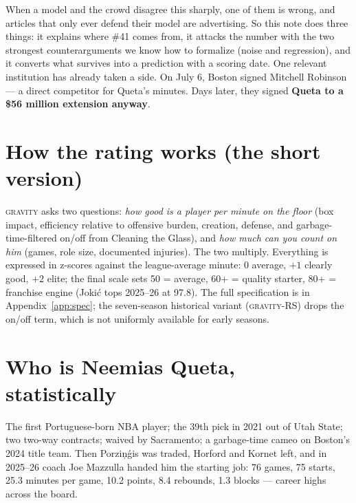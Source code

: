 \documentclass[11pt]{article}
\newcommand{\gravity}{\textsc{gravity}}
\begin{document}
When a model and the crowd disagree this sharply, one of them is wrong, and articles that
only ever defend their model are advertising. So this note does three things: it explains
where \#41 comes from, it attacks the number with the two strongest counterarguments we
know how to formalize (noise and regression), and it converts what survives into a
prediction with a scoring date. One relevant institution has already taken a side.
On July 6, Boston signed Mitchell Robinson --- a direct competitor for Queta's minutes.
Days later, they signed \textbf{Queta to a \$56 million extension anyway}.

\section{How the rating works (the short version)}
\label{sec:short}

\gravity{} asks two questions: \emph{how good is a player per minute on the floor}
(box impact, efficiency relative to offensive burden, creation, defense, and
garbage-time-filtered on/off from Cleaning the Glass), and \emph{how much can you count
on him} (games, role size, documented injuries). The two multiply. Everything is
expressed in z-scores against the league-average minute: $0$ average, $+1$ clearly good,
$+2$ elite; the final scale sets 50 = average, 60+ = quality starter, 80+ = franchise
engine (Joki\'c tops 2025--26 at 97.8). The full specification is in
Appendix~\ref{app:spec}; the seven-season historical variant (\gravity-RS) drops the
on/off term, which is not uniformly available for early seasons.

\section{Who is Neemias Queta, statistically}
\label{sec:career}

The first Portuguese-born NBA player; the 39th pick in 2021 out of Utah State; two
two-way contracts; waived by Sacramento; a garbage-time cameo on Boston's 2024 title
team. Then Porzi\c{n}\'gis was traded, Horford and Kornet left, and in 2025--26 coach
Joe Mazzulla handed him the starting job: 76 games, 75 starts, 25.3 minutes per game,
10.2 points, 8.4 rebounds, 1.3 blocks --- career highs across the board.
\end{document}
